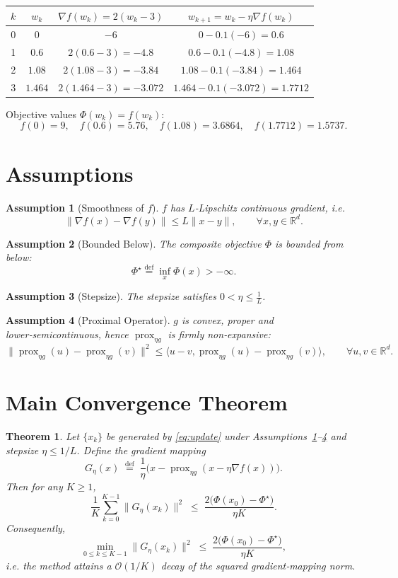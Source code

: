 \documentclass{article}
\newtheorem{theorem}{Theorem}
\newtheorem{assumption}{Assumption}
\newcommand{\prox}{\operatorname{prox}}
\newcommand{\grad}{\nabla}
\newcommand{\R}{\mathbb{R}}
\begin{document}
\begin{center}
\begin{tabular}{c|c|c|c}
$k$ & $w_k$ & $\grad f(w_k)=2(w_k-3)$ & $w_{k+1}=w_k-\eta\grad f(w_k)$ \\ \hline
0 & $0$ & $-6$ & $0-0.1(-6)=0.6$ \\
1 & $0.6$ & $2(0.6-3)=-4.8$ & $0.6-0.1(-4.8)=1.08$ \\
2 & $1.08$ & $2(1.08-3)=-3.84$ & $1.08-0.1(-3.84)=1.464$ \\
3 & $1.464$ & $2(1.464-3)=-3.072$ & $1.464-0.1(-3.072)=1.7712$
\end{tabular}
\end{center}
Objective values $\Phi(w_k)=f(w_k)$:
\[
f(0)=9,\quad f(0.6)=5.76,\quad f(1.08)=3.6864,\quad f(1.7712)=1.5737.
\]

\newpage
\section*{Assumptions}
\begin{assumption}[Smoothness of $f$]
\label{ass:smooth}
$f$ has $L$‑Lipschitz continuous gradient, i.e.
\[
\|\grad f(x)-\grad f(y)\|\le L\|x-y\|,\qquad\forall x,y\in\R^{d}.
\]
\end{assumption}
\begin{assumption}[Bounded Below]
\label{ass:lower}
The composite objective $\Phi$ is bounded from below:
\[
\Phi^{\star}\stackrel{\mathrm{def}}{=}\inf_{x}\Phi(x)>-\infty.
\]
\end{assumption}
\begin{assumption}[Stepsize]
\label{ass:stepsize}
The stepsize satisfies $0<\eta\le \frac{1}{L}$.
\end{assumption}
\begin{assumption}[Proximal Operator]
\label{ass:prox}
$g$ is convex, proper and lower‑semicontinuous, hence $\prox_{\eta g}$ is \emph{firmly non‑expansive}:
\[
\|\prox_{\eta g}(u)-\prox_{\eta g}(v)\|^{2}
\le \langle u-v,\prox_{\eta g}(u)-\prox_{\eta g}(v)\rangle,\qquad\forall u,v\in\R^{d}.
\tag{NE}
\]
\end{assumption}

\section*{Main Convergence Theorem}
\begin{theorem}
\label{thm:main}
Let $\{x_k\}$ be generated by \eqref{eq:update} under Assumptions~\ref{ass:smooth}–\ref{ass:prox} and stepsize $\eta\le 1/L$. Define the \emph{gradient mapping}
\[
G_{\eta}(x)\;\stackrel{\mathrm{def}}{=}\;\frac{1}{\eta}\bigl(x-\prox_{\eta g}(x-\eta\grad f(x))\bigr).
\]
Then for any $K\ge1$,
\begin{equation}
\label{eq:avg-bound}
\frac{1}{K}\sum_{k=0}^{K-1}\|G_{\eta}(x_k)\|^{2}
\;\le\;
\frac{2\bigl(\Phi(x_0)-\Phi^{\star}\bigr)}{\eta K}.
\end{equation}
Consequently,
\[
\min_{0\le k\le K-1}\|G_{\eta}(x_k)\|^{2}
\;\le\;
\frac{2\bigl(\Phi(x_0)-\Phi^{\star}\bigr)}{\eta K},
\]
i.e. the method attains a \(\mathcal{O}(1/K)\) decay of the squared gradient‑mapping norm.
\end{theorem}
\end{document}
